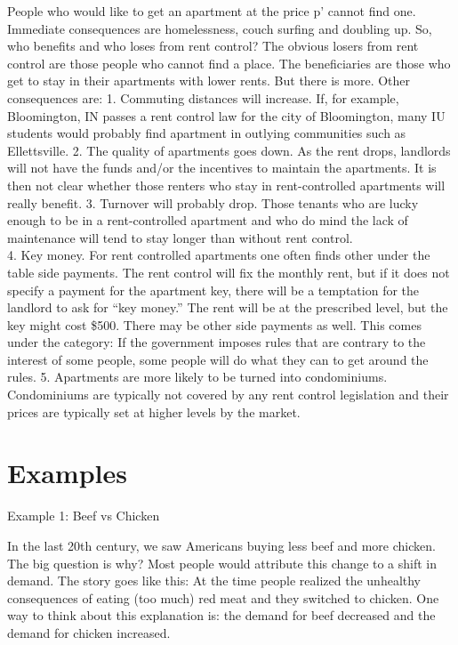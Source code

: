 \documentclass[
]{book}
\begin{document}
People who would like to get an apartment at the price p' cannot find one. Immediate consequences are homelessness, couch surfing and doubling up. So, who benefits and who loses from rent control? The obvious losers from rent control are those people who cannot find a place. The beneficiaries are those who get to stay in their apartments with lower rents.
But there is more. Other consequences are:
1. Commuting distances will increase. If, for example, Bloomington, IN passes a rent control law for the city of Bloomington, many IU students would probably find apartment in outlying communities such as Ellettsville.
2. The quality of apartments goes down. As the rent drops, landlords will not have the funds and/or the incentives to maintain the apartments. It is then not clear whether those renters who stay in rent-controlled apartments will really benefit.
3. Turnover will probably drop. Those tenants who are lucky enough to be in a rent-controlled apartment and who do mind the lack of maintenance will tend to stay longer than without rent control.\\
4. Key money. For rent controlled apartments one often finds other under the table side payments. The rent control will fix the monthly rent, but if it does not specify a payment for the apartment key, there will be a temptation for the landlord to ask for ``key money.'' The rent will be at the prescribed level, but the key might cost \$500. There may be other side payments as well. This comes under the category: If the government imposes rules that are contrary to the interest of some people, some people will do what they can to get around the rules.
5. Apartments are more likely to be turned into condominiums. Condominiums are typically not covered by any rent control legislation and their prices are typically set at higher levels by the market.

\hypertarget{examples-2}{%
\section{Examples}\label{examples-2}}

Example 1: Beef vs Chicken

In the last 20th century, we saw Americans buying less beef and more chicken. The big question is why? Most people would attribute this change to a shift in demand. The story goes like this: At the time people realized the unhealthy consequences of eating (too much) red meat and they switched to chicken. One way to think about this explanation is: the demand for beef decreased and the demand for chicken increased.
\end{document}
